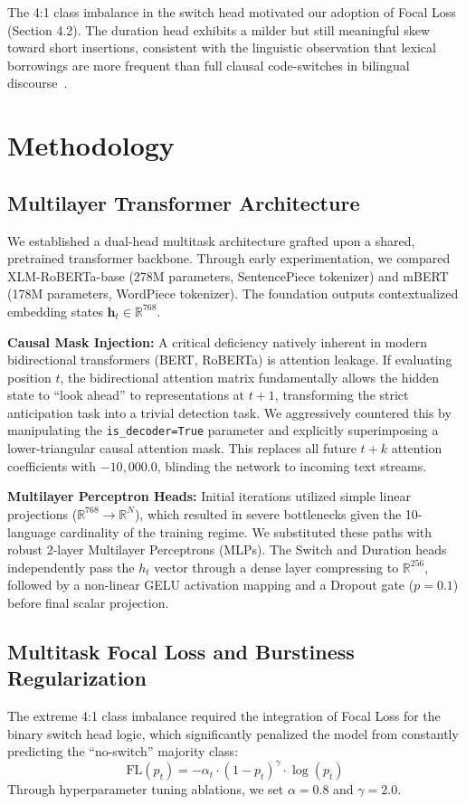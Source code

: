 \documentclass[sigconf,nonacm]{acmart}
\begin{document}
The 4:1 class imbalance in the switch head motivated our adoption of Focal Loss (Section 4.2). The duration head exhibits a milder but still meaningful skew toward short insertions, consistent with the linguistic observation that lexical borrowings are more frequent than full clausal code-switches in bilingual discourse~\cite{winata2023decades}.

\section{Methodology}

\subsection{Multilayer Transformer Architecture}
We established a dual-head multitask architecture grafted upon a shared, pretrained transformer backbone. Through early experimentation, we compared XLM-RoBERTa-base (278M parameters, SentencePiece tokenizer) and mBERT (178M parameters, WordPiece tokenizer). The foundation outputs contextualized embedding states \(\mathbf{h}_t \in \mathbb{R}^{768}\).

\textbf{Causal Mask Injection:}
A critical deficiency natively inherent in modern bidirectional transformers (BERT, RoBERTa) is attention leakage. If evaluating position \(t\), the bidirectional attention matrix fundamentally allows the hidden state to ``look ahead'' to representations at \(t+1\), transforming the strict anticipation task into a trivial detection task. We aggressively countered this by manipulating the \verb|is_decoder=True| parameter and explicitly superimposing a lower-triangular causal attention mask. This replaces all future \(t+k\) attention coefficients with \(-10{,}000.0\), blinding the network to incoming text streams.

\textbf{Multilayer Perceptron Heads:}
Initial iterations utilized simple linear projections (\(\mathbb{R}^{768} \rightarrow \mathbb{R}^{N}\)), which resulted in severe bottlenecks given the 10-language cardinality of the training regime. We substituted these paths with robust 2-layer Multilayer Perceptrons (MLPs). The Switch and Duration heads independently pass the \(h_t\) vector through a dense layer compressing to \(\mathbb{R}^{256}\), followed by a non-linear GELU activation mapping and a Dropout gate (\(p = 0.1\)) before final scalar projection. 

\subsection{Multitask Focal Loss and Burstiness Regularization}
The extreme 4:1 class imbalance required the integration of Focal Loss for the binary switch head logic, which significantly penalized the model from constantly predicting the ``no-switch'' majority class:
\begin{equation}
    \text{FL}(p_t) = -\alpha_t \cdot (1 - p_t)^\gamma \cdot \log(p_t)
\end{equation}
Through hyperparameter tuning ablations, we set \(\alpha = 0.8\) and \(\gamma = 2.0\).
\end{document}
